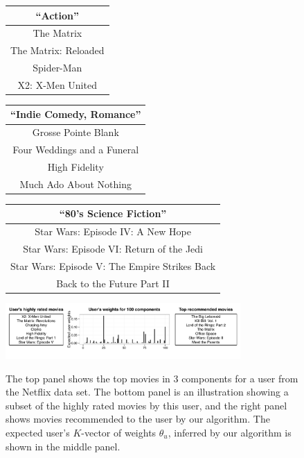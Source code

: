 \begin{figure}[th]
\centering
\vspace{0.1cm}
\small
\begin{tabular}{c}
\bf{``Action''}\\
\midrule
The Matrix\\
The Matrix: Reloaded\\
Spider-Man\\
X2: X-Men United\\
\bottomrule
\end{tabular}
\begin{tabular}{c}
\bf{``Indie Comedy, Romance''}\\
\midrule
Grosse Pointe Blank\\
Four Weddings and a Funeral\\
High Fidelity\\
Much Ado About Nothing\\
\bottomrule
\end{tabular}
\begin{tabular}{c}
\bf{``80's Science Fiction''}\\
\midrule
Star Wars: Episode IV: A New Hope\\
Star Wars: Episode VI: Return of the Jedi\\
Star Wars: Episode V: The Empire Strikes Back\\
Back to the Future Part II\\
\bottomrule
\end{tabular}

\vspace{0.5cm}

\centering
\includegraphics[width=0.8\textwidth]{figures/netflix-exploratory.pdf}\\
\caption{ The top panel shows the top movies in 3 components for a
  user from the Netflix data set. The bottom panel is an illustration
  showing a subset of the highly rated movies by this user, and the
  right panel shows movies recommended to the user by our
  algorithm. The expected user's $K$-vector of weights $\theta_u$,
  inferred by our algorithm is shown in the middle panel.}
\label{fig:netflix-illustration}
\end{figure}

